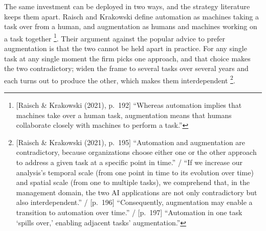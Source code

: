 The same investment can be deployed in two ways, and the strategy literature keeps them
apart. Raisch and Krakowski define automation as machines taking a task over from a
human, and augmentation as humans and machines working on a task
together \parencite[p.~192]{raisch2021artificial}\footnote{[Raisch \& Krakowski (2021),
p.~192] ``Whereas automation implies that machines take over a human task, augmentation
means that humans collaborate closely with machines to perform a task.''}. Their argument
against the popular advice to prefer augmentation is that the two cannot be held apart in
practice. For any single task at any single moment the firm picks one approach, and that
choice makes the two contradictory; widen the frame to several tasks over several years
and each turns out to produce the other, which makes them
interdependent \parencite[pp.~195--197]{raisch2021artificial}\footnote{[Raisch \&
Krakowski (2021), p.~195] ``Automation and augmentation are contradictory, because
organizations choose either one or the other approach to address a given task at a
specific point in time.'' / ``If we increase our analysis's temporal scale (from one
point in time to its evolution over time) and spatial scale (from one to multiple
tasks), we comprehend that, in the management domain, the two AI applications are not
only contradictory but also interdependent.'' / [p.~196] ``Consequently, augmentation
may enable a transition to automation over time.'' / [p.~197] ``Automation in one task
`spills over,' enabling adjacent tasks' augmentation.''}.

